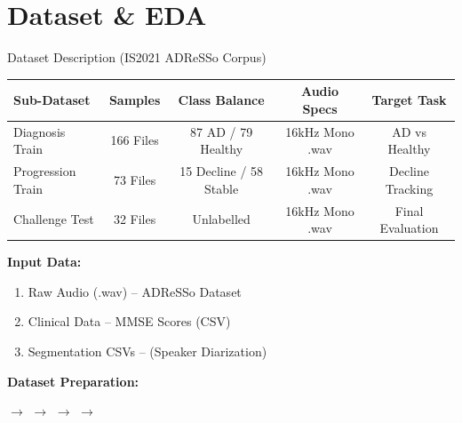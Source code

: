 \documentclass[aspectratio=169]{beamer}
\begin{document}
\section{Dataset \& EDA}
\begin{frame}{Dataset Description (IS2021 ADReSSo Corpus)}
    \begin{table}
    \centering
    \scriptsize
    \begin{tabular}{lcccc}
        \toprule
        \textbf{Sub-Dataset} & \textbf{Samples} & \textbf{Class Balance} & \textbf{Audio Specs} & \textbf{Target Task} \\
        \midrule
        Diagnosis Train & 166 Files & 87 AD / 79 Healthy & 16kHz Mono .wav & AD vs Healthy \\
        Progression Train & 73 Files & 15 Decline / 58 Stable & 16kHz Mono .wav & Decline Tracking \\
        Challenge Test & 32 Files & Unlabelled & 16kHz Mono .wav & Final Evaluation \\
        \bottomrule
    \end{tabular}
    \end{table}

    \vspace{-0.1cm}
    \textbf{\small Input Data:}
    \begin{enumerate}
        \small
        \setlength{\itemsep}{0pt}
        \item Raw Audio (.wav) -- ADReSSo Dataset
        \item Clinical Data -- MMSE Scores (CSV)
        \item Segmentation CSVs -- (Speaker Diarization)
    \end{enumerate}

    \vspace{0.1cm}
    \textbf{\small Dataset Preparation:}
    \vspace{0.1cm}
    \begin{center}
        \tiny
        \setlength{\fboxsep}{3pt}
         $\rightarrow$ 
         $\rightarrow$ 
         $\rightarrow$ 
         $\rightarrow$ 
    \end{center}
\end{frame}
\end{document}
